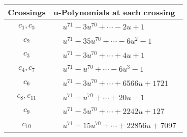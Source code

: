 \documentclass[1p]{elsarticle_modified}
\theoremstyle{definition}
\begin{document}
\begin{tabular}{m{50pt}|m{274pt}}
Crossings & \hspace{64pt}u-Polynomials at each crossing \\
\hline $$\begin{aligned}c_{1},c_{5}\end{aligned}$$&$\begin{aligned}
&u^{71}-3 u^{70}+\cdots-2 u+1
\end{aligned}$\\
\hline $$\begin{aligned}c_{2}\end{aligned}$$&$\begin{aligned}
&u^{71}+35 u^{70}+\cdots-6 u^2-1
\end{aligned}$\\
\hline $$\begin{aligned}c_{3}\end{aligned}$$&$\begin{aligned}
&u^{71}+3 u^{70}+\cdots+4 u+1
\end{aligned}$\\
\hline $$\begin{aligned}c_{4},c_{7}\end{aligned}$$&$\begin{aligned}
&u^{71}- u^{70}+\cdots-6 u^3-1
\end{aligned}$\\
\hline $$\begin{aligned}c_{6}\end{aligned}$$&$\begin{aligned}
&u^{71}+3 u^{70}+\cdots+6566 u+1721
\end{aligned}$\\
\hline $$\begin{aligned}c_{8},c_{11}\end{aligned}$$&$\begin{aligned}
&u^{71}+u^{70}+\cdots+20 u-1
\end{aligned}$\\
\hline $$\begin{aligned}c_{9}\end{aligned}$$&$\begin{aligned}
&u^{71}-5 u^{70}+\cdots+2242 u+127
\end{aligned}$\\
\hline $$\begin{aligned}c_{10}\end{aligned}$$&$\begin{aligned}
&u^{71}+15 u^{70}+\cdots+22856 u+7097
\end{aligned}$\\
\hline
\end{tabular}\\~\\
\end{document}
